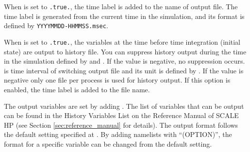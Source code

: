 When  is set to \verb|.true.|, the time label is added to the name of output file.
The time label is generated from the current time in the simulation, and its format is defined by \verb|YYYYMMDD-HHMMSS.msec|.

When  is set to \verb|.true.|, the variables at the time before time integration (initial state) are output to history file.
You can suppress history output during the time in the simulation defined by  and .
If the value is negative, no suppression occurs.
 is time interval of switching output file and its unit is defined by .
If the value is negative only one file per process is used for history output. If this option is enabled, the time label is added to the file name.



The output variables are set by adding .
The list of variables that can be output can be found in the History Variables List on the Reference Manual of SCALE HP (see Section \ref{sec:reference_manual} for details).
The output format follows the default setting specified at .
By adding namelists with ``(OPTION)'', the format for a specific variable can be changed from the default setting.

